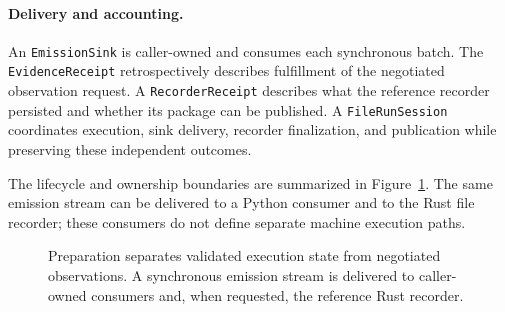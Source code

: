 \paragraph{Delivery and accounting.}
An \texttt{EmissionSink} is caller-owned and consumes each synchronous batch.
The \texttt{Evidence\allowbreak Receipt} retrospectively describes fulfillment
of the negotiated observation request. A \texttt{Recorder\allowbreak Receipt}
describes what the reference recorder persisted and whether its package can
be published. A \texttt{FileRun\allowbreak Session} coordinates execution,
sink delivery, recorder finalization, and publication while preserving these
independent outcomes.

The lifecycle and ownership boundaries are summarized in
Figure~\ref{fig:architecture}. The same emission stream can be delivered to a
Python consumer and to the Rust file recorder; these consumers do not define
separate machine execution paths.

\begin{figure}[t]
  \centering
  
  \caption{Preparation separates validated execution state from negotiated
  observations. A synchronous emission stream is delivered to caller-owned
  consumers and, when requested, the reference Rust recorder.}
  \label{fig:architecture}
\end{figure}
